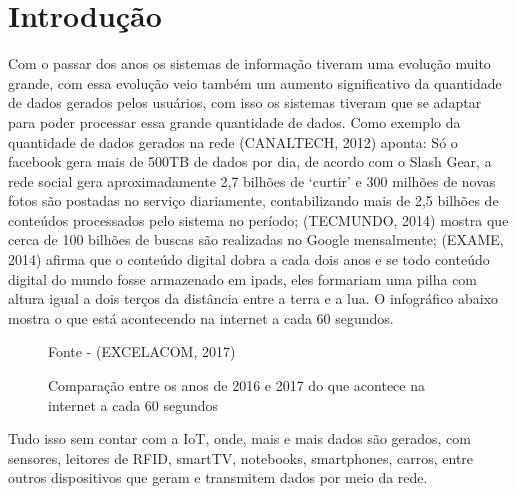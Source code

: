\chapter{Introdução}
\label{CAP:introducao}

Com o passar dos anos os sistemas de informação tiveram uma evolução muito grande, com essa evolução veio também um aumento significativo da quantidade de dados gerados pelos usuários, com isso os sistemas tiveram que se adaptar para poder processar essa grande quantidade de dados. 
Como exemplo da quantidade de dados gerados na rede (CANALTECH, 2012) aponta: Só o facebook gera mais de 500TB de dados por dia, de acordo com o Slash Gear, a rede social gera aproximadamente 2,7 bilhões de ‘curtir’ e 300 milhões de novas fotos são postadas no serviço diariamente, contabilizando mais de 2,5 bilhões de conteúdos processados pelo sistema no período; (TECMUNDO, 2014) mostra que cerca de 100 bilhões de buscas são realizadas no Google mensalmente; (EXAME, 2014) afirma que o conteúdo digital dobra a cada dois anos e se todo conteúdo digital do mundo fosse armazenado em ipads, eles formariam uma pilha com altura igual a dois terços da distância entre a terra e a lua. O infográfico abaixo mostra o que está acontecendo na internet a cada 60 segundos. 


\begin{figure}[htbp!] 
	\begin{center}
		\caption{Comparação entre os anos de 2016 e 2017 do que acontece na internet a cada 60 segundos}
		\small{Fonte - (EXCELACOM, 2017)}
		\label{Fig:testeAcontecimento}
	\end{center} 
\end{figure}

Tudo isso sem contar com a IoT, onde, mais e mais dados são gerados, com sensores, leitores de RFID, smartTV, notebooks, smartphones, carros, entre outros dispositivos que geram e transmitem dados por meio da rede.

